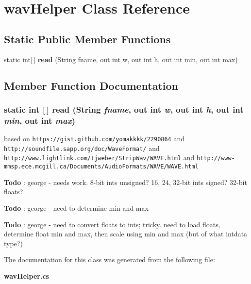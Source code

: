 \section{wav\-Helper Class Reference}
\label{class_c_s_image_viewer_1_1wav_helper}
\subsection*{Static Public Member Functions}
\begin{CompactItemize}
\item 
static int[$\,$] {\bf read} (String fname, out int w, out int h, out int min, out int max)
\end{CompactItemize}


\subsection{Member Function Documentation}
\subsubsection{\setlength{\rightskip}{0pt plus 5cm}static int [$\,$] read (String {\em fname}, out int {\em w}, out int {\em h}, out int {\em min}, out int {\em max})\hspace{0.3cm}{\tt  [static]}}\label{class_c_s_image_viewer_1_1wav_helper_82fc29c317a64b6536d17d07faecf798}


based on {\tt https://gist.github.com/yomakkkk/2290864} and {\tt http://soundfile.sapp.org/doc/Wave\-Format/} and {\tt http://www.lightlink.com/tjweber/Strip\-Wav/WAVE.html} and {\tt http://www-mmsp.ece.mcgill.ca/Documents/Audio\-Formats/WAVE/WAVE.html}

\begin{Desc}
\item[{\bf Todo}]: george - needs work. 8-bit ints unsigned? 16, 24, 32-bit ints signed? 32-bit floats? \end{Desc}
\begin{Desc}
\item[{\bf Todo}]: george - need to determine min and max \end{Desc}


\begin{Desc}
\item[{\bf Todo}]: george - need to convert floats to ints; tricky. need to load floats, determine float min and max, then scale using min and max (but of what intdata type?) \end{Desc}


The documentation for this class was generated from the following file:\begin{CompactItemize}
\item 
{\bf wav\-Helper.cs}\end{CompactItemize}
